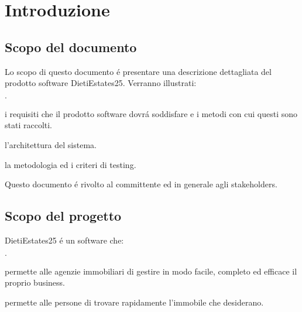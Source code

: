 \chapter{Introduzione}
\section{Scopo del documento}

Lo scopo di questo documento é presentare una descrizione dettagliata del 
prodotto software DietiEstates25. Verranno illustrati: 
\begin{list}{$\cdot$}{}
    \item i requisiti che il prodotto software dovrá soddisfare e i metodi con cui questi sono stati raccolti.
    \item l'architettura del sistema.
    \item la metodologia ed i criteri di testing.
\end{list} 

\noindent 
Questo documento é rivolto al committente ed in generale agli stakeholders. 

\section{Scopo del progetto}
DietiEstates25 é un software che:
\begin{list}{$\cdot$}{}
    \item permette alle agenzie immobiliari di gestire in modo facile,
    completo ed efficace il proprio business.
    \item permette alle persone di trovare rapidamente l'immobile 
    che desiderano.
\end{list}

